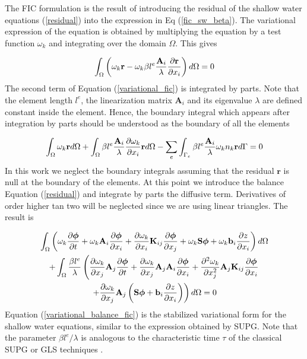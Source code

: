 The FIC formulation is the result of introducing the residual of the shallow water equations (\ref{residual}) into the expression in Eq (\ref{fic_sw_beta}). The variational expression of the equation is obtained by multiplying the equation by a test function $\omega_k$ and integrating over the domain $\Omega$. This gives

\begin{equation} \label{variational_fic}
\int_\Omega \left(
    \omega_k \mathbf{r} - \omega_k \beta l^e\frac{\mathbf{A}_i}{\lambda}\frac{\partial\mathbf{r}}{\partial x_i}
\right) d\Omega = 0
\end{equation}
The second term of Equation (\ref{variational_fic}) is integrated by parts. Note that the element length $l^e$, the linearization matrix $\mathbf{A}_i$ and its eigenvalue $\lambda$ are defined constant inside the element. Hence, the boundary integral which appears after integration by parts should be understood as the boundary of all the elements

\begin{equation} \label{variational_fic_parts}
\int_\Omega \omega_k \mathbf{r} d\Omega
+ \int_\Omega \beta l^e\frac{\mathbf{A}_i}{\lambda}\frac{\partial\omega_k}{\partial x_i} \mathbf{r} d\Omega
- \sum_e \int_{\Gamma_e} \beta l^e\frac{\mathbf{A}_i}{\lambda}\omega_kn_k \mathbf{r} d\Gamma = 0
\end{equation}
In this work we neglect the boundary integrals assuming that the residual $\mathbf{r}$ is null at the boundary of the elements. At this point we introduce the balance Equation (\ref{residual}) and integrate by parts the diffusive term.
Derivatives of order higher tan two will be neglected since we are using linear triangles.
The result is

\begin{multline} \label{variational_balance_fic}
\int_\Omega \left(
    \omega_k \frac{\partial\bm{\phi}}{\partial t} + \omega_k \mathbf{A}_i\frac{\partial\bm{\phi}}{\partial x_i}
    + \frac{\partial\omega_k}{\partial x_i} \mathbf{K}_{ij} \frac{\partial\bm{\phi}}{\partial x_j} + \omega_k \mathbf{S}\bm{\phi} + \omega_k \mathbf{b}_i\frac{\partial z}{\partial x_i}
\right) d\Omega\\ +
\int_\Omega \frac{\beta l^e}{\lambda} \left(
    \frac{\partial\omega_k}{\partial x_j} \mathbf{A}_j \frac{\partial\bm{\phi}}{\partial t}
    + \frac{\partial\omega_k}{\partial x_j} \mathbf{A}_j\mathbf{A}_i\frac{\partial\bm{\phi}}{\partial x_i}
    + \frac{\partial^2\omega_k}{\partial x_j^2} \mathbf{A}_j\mathbf{K}_{ij} \frac{\partial\bm{\phi}}{\partial x_i} \right. \\
    \left.
    + \frac{\partial\omega_k}{\partial x_j} \mathbf{A}_j \left( \mathbf{S}\bm{\phi} + \mathbf{b}_i\frac{\partial z}{\partial x_i} \right)
\right) d\Omega
=0
\end{multline}
Equation (\ref{variational_balance_fic}) is the stabilized variational form for the shallow water equations, similar to the expression obtained by SUPG. Note that the parameter $\beta l^e/\lambda$ is analogous to the characteristic time $\tau$ of the classical SUPG or GLS techniques \cite{cotela2016}.




